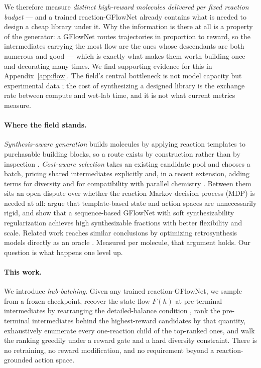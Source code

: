 \documentclass{article}
\begin{document}
We therefore measure \emph{distinct high-reward molecules delivered per fixed reaction budget} --- and a trained reaction-GFlowNet already contains what is needed to design a cheap library under it. Why the information is there at all is a property of the generator: a GFlowNet routes trajectories in proportion to reward, so the intermediates carrying the most flow are the ones whose descendants are both numerous and good --- which is exactly what makes them worth building once and decorating many times. We find supporting evidence for this in Appendix~\ref{app:flow}. The field's central bottleneck is not model capacity but experimental data \citep{abolhasani2023sdl,tom2024sdl}; the cost of synthesizing a designed library is the exchange rate between compute and wet-lab time, and it is not what current metrics measure.

\paragraph{Where the field stands.}
\emph{Synthesis-aware generation} builds molecules by applying reaction templates to
purchasable building blocks, so a route exists by construction rather than by inspection \citep{koziarski2024rgfn,cretu2025synflownet,seo2024rxnflow,gainski2026scent,gao2025synformer}. \emph{Cost-aware selection} takes an existing candidate pool and chooses a batch, pricing shared intermediates explicitly \citep{fromer2024sparrow} and, in a recent extension,
adding terms for diversity and for compatibility with parallel chemistry
\citep{fromer2025diversity}. Between them sits an open dispute over whether the reaction Markov decision process (MDP) is needed at all: \citet{kim2026s3gfn} argue that template-based state and action spaces are unnecessarily rigid, and show that a sequence-based GFlowNet with soft synthesizability regularization achieves high synthesizable fractions with better flexibility and scale. Related work reaches similar conclusions by optimizing retrosynthesis models directly as an oracle \citep{guo2024saturn,guo2026tango}. Measured per molecule, that argument holds. Our question is what happens one level up.

\paragraph{This work.}
We introduce \emph{hub-batching}. Given any trained reaction-GFlowNet, we sample from a
frozen checkpoint, recover the state flow $F(h)$ at pre-terminal intermediates by
rearranging the detailed-balance condition
\citep{bengio2023gflownetfoundations,malkin2022trajectorybalance}, rank the pre-terminal intermediates behind the highest-reward candidates by that quantity, exhaustively enumerate every one-reaction child of the top-ranked ones, and walk the ranking greedily under a reward gate and a hard diversity constraint. There is no retraining, no reward modification, and no requirement beyond a reaction-grounded action space.
\end{document}
